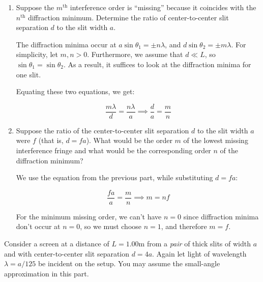 \documentclass[10pt]{article}
\begin{document}
    \begin{enumerate}[start, label = \alph*)]
        \item Suppose the $m^{\text{th}}$ interference order is ``missing'' because it coincides with the $n^{\text{th}}$ diffraction minimum. Determine the ratio of center-to-center slit separation $d$ to the slit width $a$. 
        
        \begin{solution}
            The diffraction minima occur at $a \sin \theta_1 = \pm n \lambda$, and $d \sin \theta_2 = \pm m \lambda$. For simplicity, let $m, n > 0$. Furthermore, we assume that $d \ll L$, so $\sin \theta_1 = \sin \theta_2$. As a result, it suffices to look at the diffraction minima for one slit. 

            Equating these two equations, we get:

            \[ \frac{m\lambda}{d} = \frac{n\lambda}{a} \implies \frac{d}{a} = \frac{m}{n}\] 

            
        \end{solution}
        \item Suppose the ratio of the center-to-center slit separation $d$ to the slit width $a$ were $f$ (that is, $d = fa$). What would be the order $m$ of the lowest missing interference fringe and what would be the corresponding order $n$ of the diffraction minimum?
        
        \begin{solution}
            We use the equation from the previous part, while substituting $d = fa$: 

            \[ \frac{fa}{a} = \frac{m}{n} \implies m = nf\]

            For the minimum missing order, we can't have $n = 0$ since diffraction minima don't occur at $n = 0$, so we must choose $n = 1$, and therefore $m = f$. 
        \end{solution}
    \end{enumerate}

    Consider a screen at a distance of $L = 1.00$m from a \textit{pair} of thick slits of width $a$ and with center-to-center slit separation $d = 4a$. Again let light of wavelength $\lambda = a/125$ be incident on the setup. You may assume the small-angle approximation in this part. 
\end{document}
